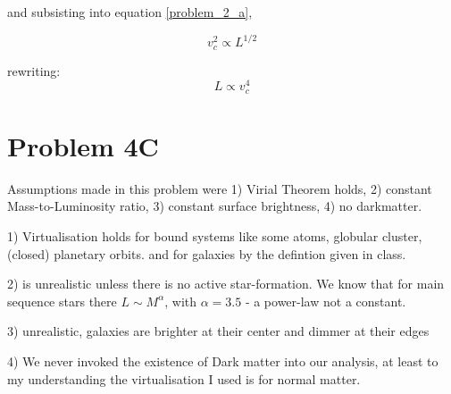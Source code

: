 and subsisting into equation \ref{problem_2_a},

\begin{equation}
    v_c^2 \propto L^{1/2}
\end{equation}

rewriting:
\begin{equation}
    \boxed{L \propto v_c^4}
\end{equation}


\section*{Problem 4C}
Assumptions made in this problem were 1) Virial Theorem holds, 2) constant Mass-to-Luminosity ratio, 3) constant surface brightness, 4) no darkmatter.


1) Virtualisation holds for bound systems like some atoms, globular cluster, (closed) planetary orbits. and for galaxies by the defintion given in class. 

2) is unrealistic unless there is no active star-formation. We know that for main sequence stars there $L \sim M^\alpha$, with $\alpha = 3.5$ - a power-law not a constant. 

3) unrealistic, galaxies are brighter at their center and dimmer at their edges

4) We never invoked the existence of Dark matter into our analysis, at least to my understanding the virtualisation I used is for normal matter.  

